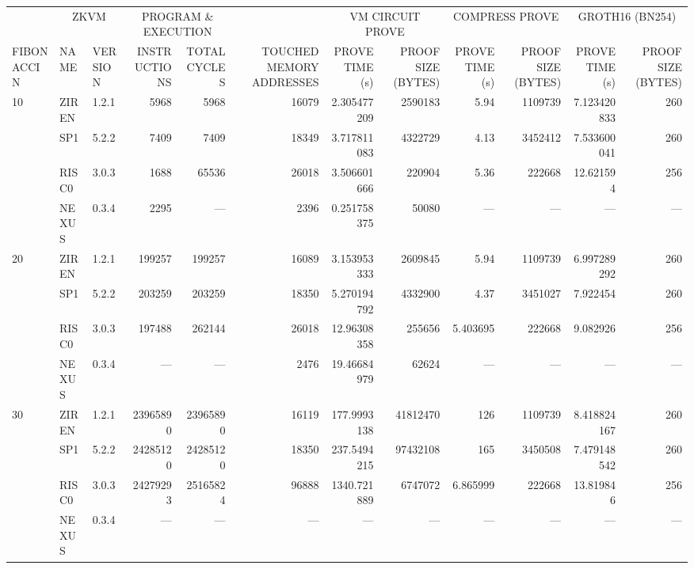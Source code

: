 \begin{table}[!ht]
    \centering
    \small %
    \setlength{\tabcolsep}{4pt} %
    \begin{tabular}{l l l r r r r r r r r r}
        \toprule
        & \multicolumn{2}{c}{ZKVM} & \multicolumn{2}{c}{PROGRAM \& EXECUTION} & & \multicolumn{2}{c}{VM CIRCUIT PROVE} & \multicolumn{2}{c}{COMPRESS PROVE} & \multicolumn{2}{c}{GROTH16 (BN254)} \\
        \cmidrule(lr){2-3} \cmidrule(lr){4-5} \cmidrule(lr){7-8} \cmidrule(lr){9-10} \cmidrule(lr){11-12}
        FIBONACCI N & NAME & VERSION & INSTRUCTIONS & TOTAL CYCLES & TOUCHED MEMORY ADDRESSES & PROVE TIME (s) & PROOF SIZE (BYTES) & PROVE TIME (s) & PROOF SIZE (BYTES) & PROVE TIME (s) & PROOF SIZE (BYTES) \\
        \midrule
        10 & ZIREN & 1.2.1 & 5968 & 5968 & 16079 & 2.305477209 & 2590183 & 5.94 & 1109739 & 7.123420833 & 260 \\
        & SP1 & 5.2.2 & 7409 & 7409 & 18349 & 3.717811083 & 4322729 & 4.13 & 3452412 & 7.533600041 & 260 \\
        & RISC0 & 3.0.3 & 1688 & 65536 & 26018 & 3.506601666 & 220904 & 5.36 & 222668 & 12.621594 & 256 \\
        & NEXUS & 0.3.4 & 2295 & — & 2396 & 0.251758375 & 50080 & — & — & — & — \\
        20 & ZIREN & 1.2.1 & 199257 & 199257 & 16089 & 3.153953333 & 2609845 & 5.94 & 1109739 & 6.997289292 & 260 \\
        & SP1 & 5.2.2 & 203259 & 203259 & 18350 & 5.270194792 & 4332900 & 4.37 & 3451027 & 7.922454 & 260 \\
        & RISC0 & 3.0.3 & 197488 & 262144 & 26018 & 12.96308358 & 255656 & 5.403695 & 222668 & 9.082926 & 256 \\
        & NEXUS & 0.3.4 & — & — & 2476 & 19.46684979 & 62624 & — & — & — & — \\
        30 & ZIREN & 1.2.1 & 23965890 & 23965890 & 16119 & 177.9993138 & 41812470 & 126 & 1109739 & 8.418824167 & 260 \\
        & SP1 & 5.2.2 & 24285120 & 24285120 & 18350 & 237.5494215 & 97432108 & 165 & 3450508 & 7.479148542 & 260 \\
        & RISC0 & 3.0.3 & 24279293 & 25165824 & 96888 & 1340.721889 & 6747072 & 6.865999 & 222668 & 13.819846 & 256 \\
        & NEXUS & 0.3.4 & — & — & — & — & — & — & — & — & — \\
        \bottomrule
    \end{tabular}
\end{table}